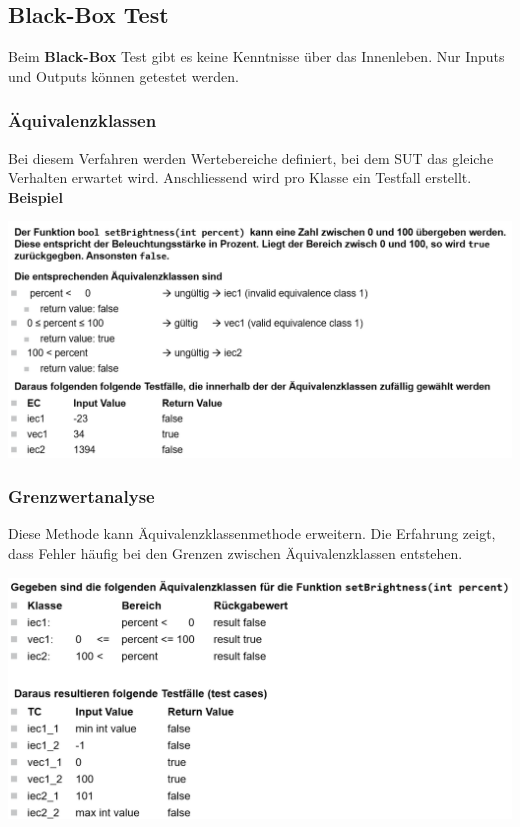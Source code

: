 \subsection{Black-Box Test}
Beim \textbf{Black-Box} Test gibt es keine Kenntnisse über das Innenleben. Nur Inputs und Outputs können getestet werden. 

\subsubsection{Äquivalenzklassen}
Bei diesem Verfahren werden Wertebereiche definiert, bei dem SUT das gleiche Verhalten erwartet wird. Anschliessend wird pro Klasse ein Testfall erstellt.~\\
\textbf{Beispiel} 

\begin{center}
	\includegraphics[width=\columnwidth]{Images/aequivalenzklassen}
\end{center}

\subsubsection{Grenzwertanalyse}
Diese Methode kann Äquivalenzklassenmethode erweitern. Die Erfahrung zeigt, dass Fehler häufig bei den Grenzen zwischen Äquivalenzklassen entstehen.
\begin{center}
	\includegraphics[width=\columnwidth]{Images/grenzwert}
\end{center}

